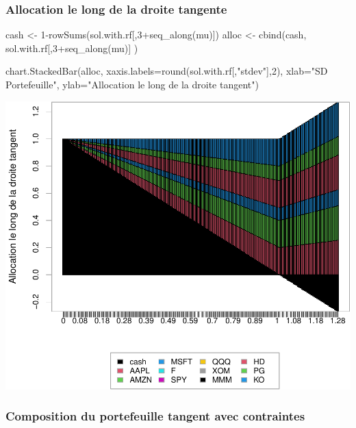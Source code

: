 \documentclass[
]{article}
\newenvironment{Shaded}{\begin{snugshade}}{\end{snugshade}}
\newcommand{\AttributeTok}[1]{\textcolor[rgb]{0.77,0.63,0.00}{#1}}
\newcommand{\DecValTok}[1]{\textcolor[rgb]{0.00,0.00,0.81}{#1}}
\newcommand{\FunctionTok}[1]{\textcolor[rgb]{0.00,0.00,0.00}{#1}}
\newcommand{\NormalTok}[1]{#1}
\newcommand{\OtherTok}[1]{\textcolor[rgb]{0.56,0.35,0.01}{#1}}
\newcommand{\SpecialCharTok}[1]{\textcolor[rgb]{0.00,0.00,0.00}{#1}}
\newcommand{\StringTok}[1]{\textcolor[rgb]{0.31,0.60,0.02}{#1}}
\begin{document}
\hypertarget{allocation-le-long-de-la-droite-tangente-1}{%
\subsubsection{Allocation le long de la droite
tangente}\label{allocation-le-long-de-la-droite-tangente-1}}

\begin{Shaded}
\begin{Highlighting}[]
\NormalTok{cash }\OtherTok{\textless{}{-}} \DecValTok{1}\SpecialCharTok{{-}}\FunctionTok{rowSums}\NormalTok{(sol.with.rf[,}\DecValTok{3}\SpecialCharTok{+}\FunctionTok{seq\_along}\NormalTok{(mu)])}
\NormalTok{alloc }\OtherTok{\textless{}{-}} \FunctionTok{cbind}\NormalTok{(cash, sol.with.rf[,}\DecValTok{3}\SpecialCharTok{+}\FunctionTok{seq\_along}\NormalTok{(mu)] )}

\FunctionTok{chart.StackedBar}\NormalTok{(alloc, }\AttributeTok{xaxis.labels=}\FunctionTok{round}\NormalTok{(sol.with.rf[,}\StringTok{"stdev"}\NormalTok{],}\DecValTok{2}\NormalTok{), }
                 \AttributeTok{xlab=}\StringTok{"SD Portefeuille"}\NormalTok{, }\AttributeTok{ylab=}\StringTok{"Allocation le long de la droite tangent"}\NormalTok{)}
\end{Highlighting}
\end{Shaded}

\includegraphics{TP-2_files/figure-latex/unnamed-chunk-15-1.pdf}

\hypertarget{composition-du-portefeuille-tangent-avec-contraintes}{%
\subsubsection{Composition du portefeuille tangent avec
contraintes}\label{composition-du-portefeuille-tangent-avec-contraintes}}
\end{document}
